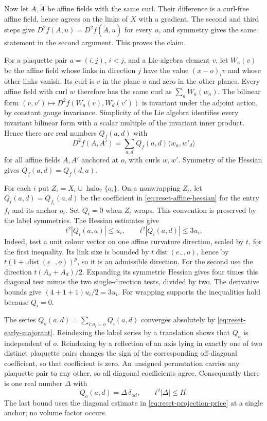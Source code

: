 Now let $A,\widetilde A$ be affine fields with the same curl. Their
difference is a curl-free affine field, hence agrees on the links of
$X$ with a gradient. The second and third steps give
$D^2f(A,u)=D^2f(\widetilde A,u)$ for every $u$, and symmetry gives
the same statement in the second argument. This proves the claim.

For a plaquette pair $a=(i,j)$, $i<j$, and a Lie-algebra element
$v$, let $W_a(v)$ be the affine field whose links in direction $j$
have the value $(x-o)_iv$ and whose other links vanish. Its curl is
$v$ in the plane $a$ and zero in the other planes. Every affine field
with curl $w$ therefore has the same curl as $\sum_aW_a(w_a)$.
The bilinear form $(v,v')\mapsto D^2f(W_a(v),W_d(v'))$ is invariant
under the adjoint action, by constant gauge invariance. Simplicity
of the Lie algebra identifies every
invariant bilinear form with a scalar multiple of the invariant
inner product. Hence there are real numbers $Q_f(a,d)$ with
\begin{equation}\label{eq:reset-affine-hessian}
 D^2f(A,A')=\sum_{a,d}Q_f(a,d)\langle w_a,w'_d\rangle
\end{equation}
for all affine fields $A,A'$ anchored at $o$, with curls $w,w'$.
Symmetry of the Hessian gives $Q_f(a,d)=Q_f(d,a)$.

For each $i$ put $Z_i=X_i\cup\operatorname{halo}_2\{o_i\}$.
On a nonwrapping $Z_i$, let $Q_i(a,d)=Q_{f_i}(a,d)$ be the
coefficient in \eqref{eq:reset-affine-hessian} for the entry $f_i$
and its anchor $o_i$. Set $Q_i=0$
when $Z_i$ wraps. This convention is preserved by the label symmetries.
The Hessian estimates give
\begin{equation}\label{eq:reset-projection-price}
 t^2|Q_i(a,a)|\le u_i,\qquad t^2|Q_i(a,d)|\le3u_i.
\end{equation}
Indeed, test a unit colour vector on one affine curvature direction,
scaled by $t$, for the first inequality. Its link size is bounded by
$t\operatorname{dist}(e_-,o)$, hence by
$t(1+\operatorname{dist}(e_-,o))^p$, so it is an admissible direction.
For the second use the
direction $t(A_a+A_d)/2$. Expanding its symmetric Hessian gives four
times this diagonal test minus the two single-direction tests, divided
by two. The derivative bounds give $(4+1+1)u_i/2=3u_i$.
For wrapping supports the inequalities hold because $Q_i=0$.

The series $Q_o(a,d)=\sum_{i:o_i=o}Q_i(a,d)$ converges absolutely
by \eqref{eq:reset-early-majorant}. Reindexing the label series by a
translation shows that $Q_o$ is independent of $o$. Reindexing by a
reflection of an axis lying in exactly one of two distinct plaquette
pairs changes the sign of the corresponding off-diagonal coefficient,
so that coefficient is zero. An unsigned permutation carries any
plaquette pair to any other, so all diagonal coefficients agree.
Consequently there is one real number $\Delta$ with
\begin{equation}\label{eq:reset-isotropic-coefficient}
                   Q_o(a,d)=\Delta\,\delta_{ad},
                       \qquad t^2|\Delta|\le H.
\end{equation}
The last bound uses the diagonal estimate in
\eqref{eq:reset-projection-price} at a single anchor; no volume factor
occurs.

